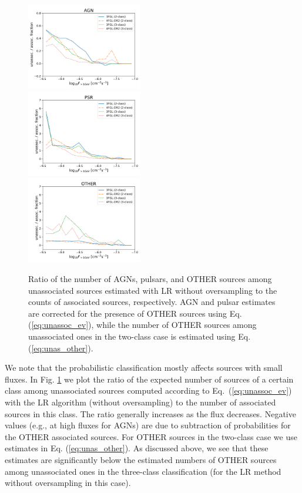 \documentclass[referee]{aa} %
\begin{document}
\begin{figure}[h]
\centering
\includegraphics[width=0.45\textwidth]{plots/N_logS_diff_AGN.pdf} \\
\includegraphics[width=0.45\textwidth]{plots/N_logS_diff_PSR.pdf} \\
\includegraphics[width=0.45\textwidth]{plots/N_logS_diff_OTHER.pdf}
\caption{Ratio of the number of AGNs, pulsars, and OTHER sources among unassociated sources estimated with LR without oversampling
to the counts of associated sources, respectively.
AGN and pulsar estimates are corrected for the presence of OTHER sources using Eq. (\ref{eq:unassoc_ev}),
while the number of OTHER sources among unassociated ones in the two-class case is estimated using Eq. (\ref{eq:unas_other}).
} 
\label{fig:unass_vs_ass_frac}
\end{figure}


We note that the probabilistic classification mostly affects sources with small fluxes.
In Fig. \ref{fig:unass_vs_ass_frac} we plot the ratio of the expected number of sources of a certain class among unassociated sources
computed according to Eq.~(\ref{eq:unassoc_ev}) with the LR algorithm (without oversampling) to the number of associated sources in this class.
The ratio generally increases as the flux decreases.
Negative values (e.g., at high fluxes for AGNs) are due to subtraction of probabilities for the OTHER associated sources.
For OTHER sources in the two-class case we use estimates in Eq. (\ref{eq:unas_other}).
As discussed above, we see that these estimates are significantly below the estimated numbers of OTHER sources among unassociated ones in the three-class classification (for the LR method without oversampling in this case).
\end{document}
